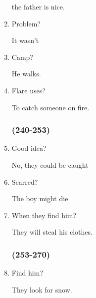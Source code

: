 \begin{multicols}{3}
\begin{enumerate}
    the father is nice.

    \item Problem?

    It wasn’t

    \item Camp?

    He walks.

    \item Flare uses?

    To catch someone on fire.

    \subsubsection{(240-253)}

    \item Good idea?

    No, they could be caught

    \item Scarred?

    The boy might die

    \item When they find him?

    They will steal his clothes.

    \subsubsection{(253-270)}

    \item Find him?

    They look for snow.
  \end{enumerate}
\end{multicols}
